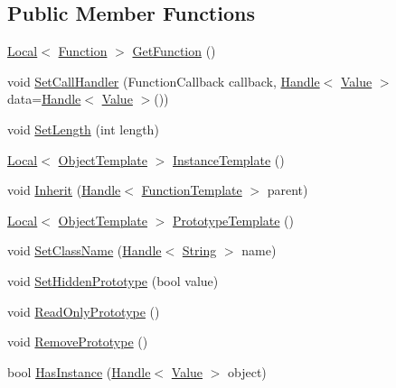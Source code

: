 \subsection*{Public Member Functions}
\begin{DoxyCompactItemize}
\item 
\hyperlink{classv8_1_1Local}{Local}$<$ \hyperlink{classv8_1_1Function}{Function} $>$ \hyperlink{classv8_1_1FunctionTemplate_a3b8e5e214b2ee34c36138961ebac696a}{Get\-Function} ()
\item 
void \hyperlink{classv8_1_1FunctionTemplate_a4805d729fbd1256b41ecaf157c740bd2}{Set\-Call\-Handler} (Function\-Callback callback, \hyperlink{classv8_1_1Handle}{Handle}$<$ \hyperlink{classv8_1_1Value}{Value} $>$ data=\hyperlink{classv8_1_1Handle}{Handle}$<$ \hyperlink{classv8_1_1Value}{Value} $>$())
\item 
void \hyperlink{classv8_1_1FunctionTemplate_a5faf23b28ee3480b23ce054d0f389a75}{Set\-Length} (int length)
\item 
\hyperlink{classv8_1_1Local}{Local}$<$ \hyperlink{classv8_1_1ObjectTemplate}{Object\-Template} $>$ \hyperlink{classv8_1_1FunctionTemplate_a00dd9725566908e8fd14064542f5a781}{Instance\-Template} ()
\item 
void \hyperlink{classv8_1_1FunctionTemplate_a18f343e7e5749ed886d6e76a1424216e}{Inherit} (\hyperlink{classv8_1_1Handle}{Handle}$<$ \hyperlink{classv8_1_1FunctionTemplate}{Function\-Template} $>$ parent)
\item 
\hyperlink{classv8_1_1Local}{Local}$<$ \hyperlink{classv8_1_1ObjectTemplate}{Object\-Template} $>$ \hyperlink{classv8_1_1FunctionTemplate_aa2bcc2652b5f0fdbc666d943ccf72021}{Prototype\-Template} ()
\item 
void \hyperlink{classv8_1_1FunctionTemplate_a10ad6f0d3d1f67823e08fbca7c5dde41}{Set\-Class\-Name} (\hyperlink{classv8_1_1Handle}{Handle}$<$ \hyperlink{classv8_1_1String}{String} $>$ name)
\item 
void \hyperlink{classv8_1_1FunctionTemplate_ade426e8a21d777ae6100e6c1aa7bfaee}{Set\-Hidden\-Prototype} (bool value)
\item 
void \hyperlink{classv8_1_1FunctionTemplate_a91d2e0643e8c5a53ab1d75f7766c2422}{Read\-Only\-Prototype} ()
\item 
void \hyperlink{classv8_1_1FunctionTemplate_a4a184aca244174c7fe52d58871d3129e}{Remove\-Prototype} ()
\item 
bool \hyperlink{classv8_1_1FunctionTemplate_aa883e4ab6643498662f7873506098c98}{Has\-Instance} (\hyperlink{classv8_1_1Handle}{Handle}$<$ \hyperlink{classv8_1_1Value}{Value} $>$ object)
\end{DoxyCompactItemize}
